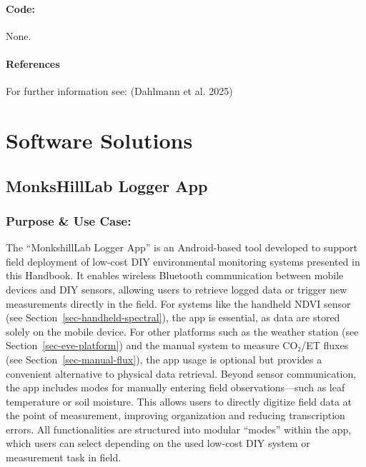\documentclass[
  11pt,
  letterpaper,
]{book}
\begin{document}
\subsubsection{Code:}\label{sec-isotope-bag-code}

None.

\subsubsection{References}\label{sec-isotope-bag-references}

For further information see: (Dahlmann et al. 2025)


\chapter{Software Solutions}\label{software-solutions}

\section{MonksHillLab Logger App}\label{sec-monkshilllab-app}

\subsection{Purpose \& Use Case:}\label{sec-monkshilllab-app-purpose}

The ``MonkshillLab Logger App'' is an Android-based tool developed to
support field deployment of low-cost DIY environmental monitoring
systems presented in this Handbook. It enables wireless Bluetooth
communication between mobile devices and DIY sensors, allowing users to
retrieve logged data or trigger new measurements directly in the field.
For systems like the handheld NDVI sensor (see
Section~\ref{sec-handheld-spectral}), the app is essential, as data are
stored solely on the mobile device. For other platforms such as the
weather station (see Section~\ref{sec-eve-platform}) and the manual
system to measure CO₂/ET fluxes (see Section~\ref{sec-manual-flux}), the
app usage is optional but provides a convenient alternative to physical
data retrieval. Beyond sensor communication, the app includes modes for
manually entering field observations---such as leaf temperature or soil
moisture. This allows users to directly digitize field data at the point
of measurement, improving organization and reducing transcription
errors. All functionalities are structured into modular ``modes'' within
the app, which users can select depending on the used low-cost DIY
system or measurement task in field.
\end{document}
